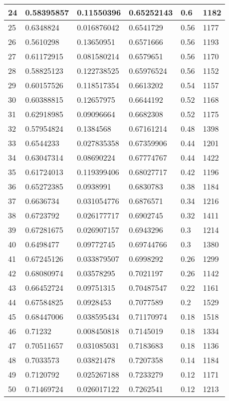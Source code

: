 \begin{longtable}{|l|l|l|l|l|l|}
24 & 0.58395857 & 0.11550396 & 0.65252143 & 0.6 & 1182 \\ \hline 
25 & 0.6348824 & 0.016876042 & 0.6541729 & 0.56 & 1177 \\ \hline 
26 & 0.5610298 & 0.13650951 & 0.6571666 & 0.56 & 1193 \\ \hline 
27 & 0.61172915 & 0.081580214 & 0.6579651 & 0.56 & 1170 \\ \hline 
28 & 0.58825123 & 0.122738525 & 0.65976524 & 0.56 & 1152 \\ \hline 
29 & 0.60157526 & 0.118517354 & 0.6613202 & 0.54 & 1157 \\ \hline 
30 & 0.60388815 & 0.12657975 & 0.6644192 & 0.52 & 1168 \\ \hline 
31 & 0.62918985 & 0.09096664 & 0.6682308 & 0.52 & 1175 \\ \hline 
32 & 0.57954824 & 0.1384568 & 0.67161214 & 0.48 & 1398 \\ \hline 
33 & 0.6544233 & 0.027835358 & 0.67359906 & 0.44 & 1201 \\ \hline 
34 & 0.63047314 & 0.08690224 & 0.67774767 & 0.44 & 1422 \\ \hline 
35 & 0.61724013 & 0.119399406 & 0.68027717 & 0.42 & 1196 \\ \hline 
36 & 0.65272385 & 0.0938991 & 0.6830783 & 0.38 & 1184 \\ \hline 
37 & 0.6636734 & 0.031054776 & 0.6876571 & 0.34 & 1216 \\ \hline 
38 & 0.6723792 & 0.026177717 & 0.6902745 & 0.32 & 1411 \\ \hline 
39 & 0.67281675 & 0.026907157 & 0.6943296 & 0.3 & 1214 \\ \hline 
40 & 0.6498477 & 0.09772745 & 0.69744766 & 0.3 & 1380 \\ \hline 
41 & 0.67245126 & 0.033879507 & 0.6998292 & 0.26 & 1299 \\ \hline 
42 & 0.68080974 & 0.03578295 & 0.7021197 & 0.26 & 1142 \\ \hline 
43 & 0.66452724 & 0.09751315 & 0.70487547 & 0.22 & 1161 \\ \hline 
44 & 0.67584825 & 0.0928453 & 0.7077589 & 0.2 & 1529 \\ \hline 
45 & 0.68447006 & 0.038595434 & 0.71170974 & 0.18 & 1518 \\ \hline 
46 & 0.71232 & 0.008450818 & 0.7145019 & 0.18 & 1334 \\ \hline 
47 & 0.70511657 & 0.031085031 & 0.7183683 & 0.18 & 1136 \\ \hline 
48 & 0.7033573 & 0.03821478 & 0.7207358 & 0.14 & 1184 \\ \hline 
49 & 0.7120792 & 0.025267188 & 0.7233279 & 0.12 & 1171 \\ \hline 
50 & 0.71469724 & 0.026017122 & 0.7262541 & 0.12 & 1213 \\ \hline 
\end{longtable}